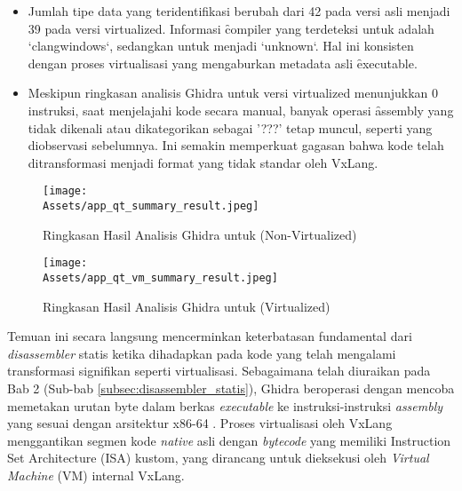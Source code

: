 \begin{itemize}
    \item {} Jumlah tipe data yang teridentifikasi berubah dari 42 pada versi asli menjadi 39 pada versi virtualized. Informasi \f{compiler} yang terdeteksi untuk  adalah `clangwindows`, sedangkan untuk  menjadi `unknown`. Hal ini konsisten dengan proses virtualisasi yang mengaburkan metadata asli \f{executable}.

    \item {} Meskipun ringkasan analisis Ghidra untuk versi virtualized menunjukkan 0 instruksi, saat menjelajahi kode secara manual, banyak operasi \f{assembly} yang tidak dikenali atau dikategorikan sebagai '???' tetap muncul, seperti yang diobservasi sebelumnya. Ini semakin memperkuat gagasan bahwa kode telah ditransformasi menjadi format yang tidak standar oleh VxLang.
\end{itemize}

\begin{figure}[H] %
    \centering
    \texttt{[image: \\Assets/app\_qt\_summary\_result.jpeg]} %
    \caption{Ringkasan Hasil Analisis Ghidra untuk  (Non-Virtualized)}
    \label{fig:ghidra_summary_qt_bab5}
\end{figure}

\begin{figure}[H] %
    \centering
    \texttt{[image: \\Assets/app\_qt\_vm\_summary\_result.jpeg]} %
    \caption{Ringkasan Hasil Analisis Ghidra untuk  (Virtualized)}
    \label{fig:ghidra_summary_qt_vm_bab5}
\end{figure}

Temuan ini secara langsung mencerminkan keterbatasan fundamental dari \textit{disassembler} statis ketika dihadapkan pada kode yang telah mengalami transformasi signifikan seperti virtualisasi. Sebagaimana telah diuraikan pada Bab 2 (Sub-bab \ref{subsec:disassembler_statis}), Ghidra beroperasi dengan mencoba memetakan urutan byte dalam berkas \textit{executable} ke instruksi-instruksi \textit{assembly} yang sesuai dengan arsitektur x86-64 \cite{Sikorski2012, Eilam2011}. Proses virtualisasi oleh VxLang menggantikan segmen kode \textit{native} asli dengan \textit{bytecode} yang memiliki Instruction Set Architecture (ISA) kustom, yang dirancang untuk dieksekusi oleh \textit{Virtual Machine} (VM) internal VxLang.

